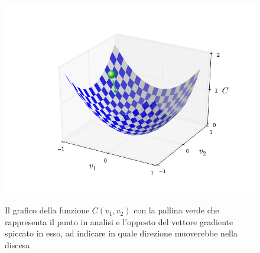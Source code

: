 \begin{figure}[hbtb]
\centering
{\includegraphics[width=.55\textwidth]{media_tesi/valley_with_ball.png}}
\caption{Il grafico della funzione $C(v_{1}, v_{2})$ con la pallina verde che rappresenta il punto in analisi e l'opposto del vettore gradiente spiccato in esso, ad indicare in quale direzione muoverebbe nella discesa}
\label{gradiente}
\end{figure}

